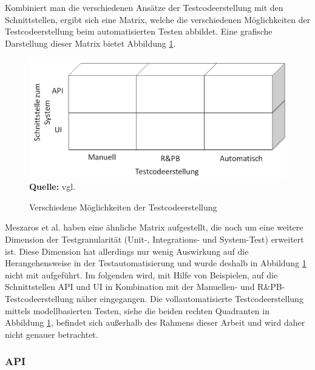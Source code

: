 Kombiniert man die verschiedenen Ansätze der Testcodeerstellung mit den Schnittstellen, ergibt sich eine Matrix, welche die verschiedenen Möglichkeiten der Testcodeerstellung beim automatisierten Testen abbildet. Eine grafische Darstellung dieser Matrix bietet Abbildung \ref{fig:bereicheTestcodeerstellung}.


\begin{figure}[htb]
  \centering  
  \includegraphics[scale=0.7]{img/bereicheTestcodeerstellung.png}\\
  \footnotesize\sffamily\textbf{Quelle:} vgl. \cite{meszaros_agile_2003}
  \caption{Verschiedene Möglichkeiten der Testcodeerstellung}
  \label{fig:bereicheTestcodeerstellung}
\end{figure}

Meszaros et al. \cite{meszaros_agile_2003} haben eine ähnliche Matrix aufgestellt, die noch um eine weitere Dimension der Testgranularität (Unit-, Integrations- und System-Test) erweitert ist. Diese Dimension hat allerdings nur wenig Auswirkung auf die Herangehensweise in der Testautomatisierung und wurde deshalb in Abbildung \ref{fig:bereicheTestcodeerstellung} nicht mit aufgeführt.
Im folgenden wird,  mit Hilfe von Beispielen, auf die Schnittstellen API und UI in Kombination mit der Manuellen- und R\&PB-Testcodeerstellung näher eingegangen.
Die vollautomatisierte Testcodeerstellung mittels modellbasierten Testen, siehe die beiden rechten Quadranten in Abbildung \ref{fig:bereicheTestcodeerstellung}, befindet sich außerhalb des Rahmens dieser Arbeit und wird daher nicht genauer betrachtet.

\subsubsection{API}
\label{subsubsec:API}

